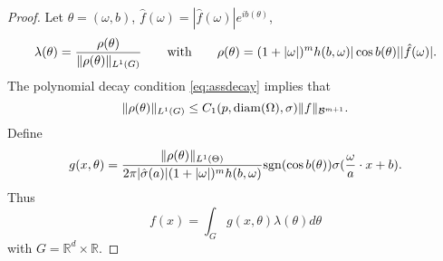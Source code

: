 \begin{proof}
Let $\theta=(\omega, b)$, $\hat f(\omega)=|\hat f(\omega)| e^{ib(\theta)}$,
\begin{equation}
\lambda(\theta) = {\rho(\theta)\over \|\rho(\theta)\|_{L^1(G)}} \qquad \text{with}\qquad \rho(\theta) = (1+|\omega|)^mh(b,\omega)|\cos b(\theta)| |\hat f(\omega)|.
\end{equation}
The polynomial decay condition \eqref{eq:assdecay} implies that
\begin{equation}\label{eq:rhostratify}
\|\rho(\theta)\|_{L^1(G)}\le  C_1(p, {\rm diam}(\Omega), \sigma)\|f\|_{\mathcal{B}^{m+1}}.
\end{equation}
Define
\begin{equation}
g(x,\theta) = {\|\rho(\theta)\|_{L^1(\Theta)}\over 2\pi |\hat \sigma (a)|(1+|\omega|)^{m}h(b,\omega)} {\rm sgn} (\cos b(\theta))\sigma ({\omega\over a}\cdot x+b).
\end{equation}
Thus
\begin{equation}
f(x)=\int_G g(x,\theta)\lambda(\theta)d\theta
\end{equation}
with $G=\mathbb{R}^d\times \mathbb{R}$. 


\end{proof}
